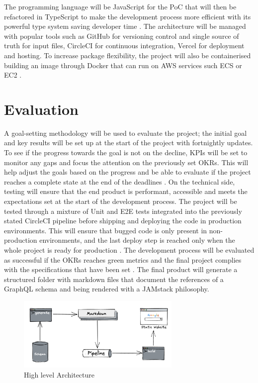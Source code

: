 The programming language will be JavaScript for
the PoC that will then be refactored in TypeScript to make the development
process more efficient with its powerful type system saving developer time
\citep{freemanUnderstandingTypeScript2021}. The architecture will be managed
with popular tools such as GitHub for versioning control and single source of
truth for input files, CircleCI for continuous integration, Vercel for
deployment and hosting. To increase package flexibility, the project will also
be containerised building an image through Docker that can run on AWS services
such ECS or EC2 \citep{pratapyadavFormalApproachDocker2021}.

\section*{Evaluation}
\label{s:Evaluation}
A goal-setting methodology will be used to evaluate the project; the initial
goal and key results will be set up at the start of the project with fortnightly
updates. To see if the progress towards the goal is not on the decline, KPIs
will be set to monitor any gaps and focus the attention on the previously set
OKRs. This will help adjust the goals based on the progress and be able to
evaluate if the project reaches a complete state at the end of the deadlines
\citep{helmoldLeanManagementKPI2020}. On the technical side, testing will ensure
that the end product is performant, accessible and meets the expectations set at
the start of the development process. The project will be tested through a
mixture of Unit and E2E tests integrated into the previously stated CircleCI
pipeline before shipping and deploying the code in production environments. This
will ensure that bugged code is only present in non-production environments, and
the last deploy step is reached only when the whole project is ready for
production \citep{yuUtilisingCIEnvironment2020}. The development process will be
evaluated as successful if the OKRs reaches green metrics and the final project
complies with the specifications that have been set
\citep{helmoldLeanManagementKPI2020}. The final product will generate a
structured folder with markdown files that document the references of a GraphQL
schema and being rendered with a JAMstack philosophy.
\begin{figure}[H]
  \centering
  \includegraphics[width=0.7\textwidth]{figures/architecture}
  \caption{High level Architecture}
  \label{f:architecture}
\end{figure}
